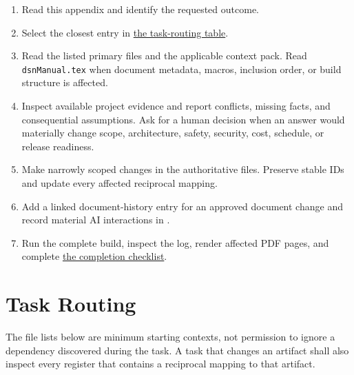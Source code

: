 \begin{enumerate}
\item Read this appendix and identify the requested outcome.
\item Select the closest entry in
\hyperref[Table:AITaskRouting]{the task-routing table}.
\item Read the listed primary files and the applicable context pack. Read
\texttt{dsnManual.tex} when document metadata, macros, inclusion order, or
build structure is affected.
\item Inspect available project evidence and report conflicts, missing facts,
and consequential assumptions. Ask for a human decision when an answer would
materially change scope, architecture, safety, security, cost, schedule, or
release readiness.
\item Make narrowly scoped changes in the authoritative files. Preserve stable
IDs and update every affected reciprocal mapping.
\item Add a linked document-history entry for an approved document change and
record material AI interactions in .
\item Run the complete build, inspect the log, render affected PDF pages, and
complete \hyperref[Table:AICompletionChecklist]{the completion checklist}.
\end{enumerate}

\section{Task Routing}
The file lists below are minimum starting contexts, not permission to ignore a
dependency discovered during the task. A task that changes an artifact shall
also inspect every register that contains a reciprocal mapping to that
artifact.

